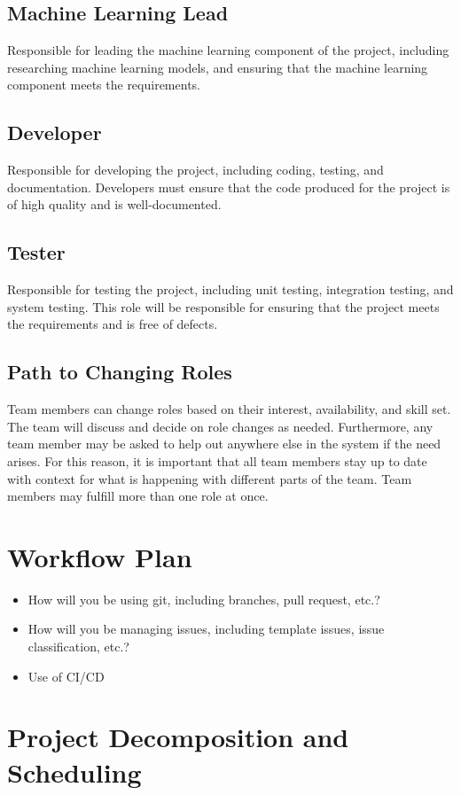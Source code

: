 \documentclass{article}
\begin{document}
\subsection*{Machine Learning Lead} Responsible for leading the machine learning component of the project, including researching machine learning models, and ensuring that the machine learning component meets the requirements.
\subsection*{Developer} Responsible for developing the project, including coding, testing, and documentation. Developers must ensure that the code produced for the project is of high quality and is well-documented.
\subsection*{Tester} Responsible for testing the project, including unit testing, integration testing, and system testing. This role will be responsible for ensuring that the project meets the requirements and is free of defects.
\subsection*{Path to Changing Roles} Team members can change roles based on their interest, availability, and skill set. The team will discuss and decide on role changes as needed. Furthermore, any team member may be asked to help out anywhere else in the system if the need arises. For this reason, it is important that all team members stay up to date with context for what is happening with different parts of the team. Team members may fulfill more than one role at once.

\section{Workflow Plan}

\begin{itemize}
	\item How will you be using git, including branches, pull request, etc.?
	\item How will you be managing issues, including template issues, issue
	classification, etc.?
  \item Use of CI/CD
\end{itemize}

\section{Project Decomposition and Scheduling}
\end{document}
